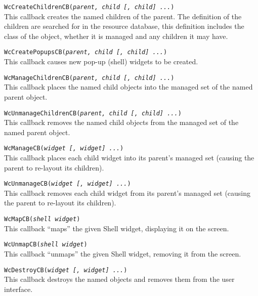 \begin{description}
\item{\tt WcCreateChildrenCB({\em parent, child [, child] ...})} \\
This callback creates the named children of the parent. The definition 
of the children are searched for in the resource database, this 
definition includes the class of the object, whether it is managed and
any children it may have.

\item{\tt WcCreatePopupsCB({\em parent, child [, child] ...})} \\
This callback causes new pop-up (shell) widgets to be created.

\item{\tt WcManageChildrenCB({\em parent, child [, child] ...})} \\
This callback places the named child objects into the managed set of the
named parent object.

\item{\tt WcUnmanageChildrenCB({\em parent, child [, child] ...})} \\
This callback removes the named child objects from the managed set of the
named parent object.

\item{\tt WcManageCB({\em widget [, widget] ...})} \\
This callback places each child widget into its parent's managed set
(causing the parent to re-layout its children).

\item{\tt WcUnmanageCB({\em widget [, widget] ...})} \\
This callback removes each child widget from its parent's managed set
(causing the parent to re-layout its children).

\item{\tt WcMapCB({\em shell widget})} \\
This callback ``maps'' the given Shell widget, displaying it on the screen. 

\item{\tt WcUnmapCB({\em shell widget})} \\
This callback ``unmaps'' the given Shell widget, removing it from the screen. 

\item{\tt WcDestroyCB({\em widget [, widget] ...})} \\
This callback destroys the named objects and removes them from the user
interface.


\end{description}
